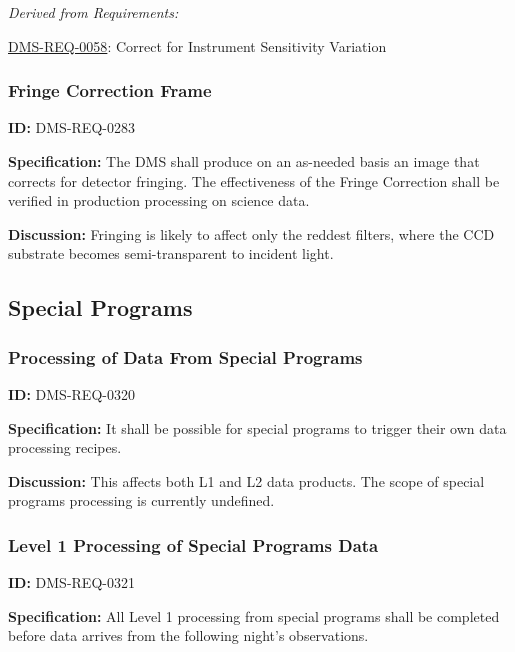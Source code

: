 \documentclass[SE,toc,lsstdraft]{lsstdoc}
\begin{document}
\emph{Derived from Requirements:}

\hyperref[DMS-REQ-0058]{DMS-REQ-0058}:
Correct for Instrument Sensitivity Variation \newline


\subsubsection{Fringe Correction Frame}

\label{DMS-REQ-0283}
\textbf{ID:} DMS-REQ-0283

\textbf{Specification:} The DMS shall produce on an as-needed basis an image that corrects for detector fringing. The effectiveness of the Fringe Correction shall be verified in production processing on science data.

\textbf{Discussion: }Fringing is likely to affect only the reddest filters, where the CCD substrate becomes semi-transparent to incident light.




\subsection{Special Programs}





\subsubsection{Processing of Data From Special Programs}

\label{DMS-REQ-0320}
\textbf{ID:} DMS-REQ-0320

\textbf{Specification:} It shall be possible for special programs to trigger their own data processing recipes.

\textbf{Discussion: }This affects both L1 and L2 data products. The scope of special programs processing is currently undefined.




\subsubsection{Level 1 Processing of Special Programs Data}

\label{DMS-REQ-0321}
\textbf{ID:} DMS-REQ-0321

\textbf{Specification:} All Level 1 processing from special programs shall be completed before data arrives from the following night's observations.
\end{document}
